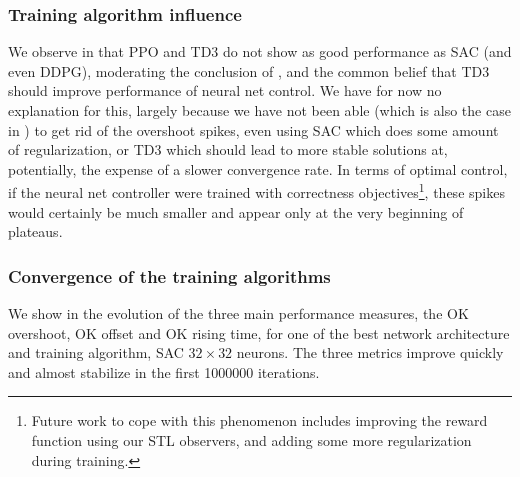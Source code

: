 \documentclass[anonymous=true,format=sigconf, screen=true, review=false]{acmart}
\begin{document}
\subsubsection{Training algorithm influence}

We observe in 
that PPO and TD3 do not show as good performance as SAC (and even DDPG), moderating the conclusion of \cite{rl}, and the common belief that TD3 should improve performance of neural net control.
We have for now no explanation for this, largely because we have not been able (which is also the case in  \cite{rl}) to get rid of the overshoot spikes, even using SAC which does some amount of regularization, or TD3 which should lead to more stable solutions at, potentially, the expense of a slower convergence rate. In terms of optimal control, if the neural net controller were trained with correctness objectives\footnote{Future work to cope with this phenomenon includes improving the reward function using our STL observers, and adding some more regularization during training.}, these spikes would certainly be much smaller and appear only at the very beginning of plateaus. %

\subsubsection{Convergence of the training algorithms}

 We show in  the evolution of the three main performance measures, the OK overshoot, OK offset and OK rising time, for one of the best network architecture and training algorithm, SAC $32 \times 32$ neurons. 
 The three metrics improve quickly and almost stabilize in the first 1000000 iterations. 
 
\end{document}
